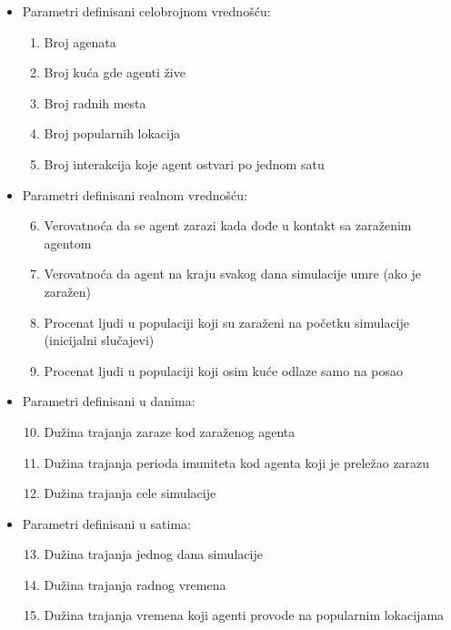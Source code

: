 \begin{itemize}
    \item Parametri definisani celobrojnom vrednošću:
    \begin{enumerate}
        \item Broj agenata
        \item Broj kuća gde agenti žive
        \item Broj radnih mesta
        \item Broj popularnih lokacija
        \item Broj interakcija koje agent ostvari po jednom satu
    \end{enumerate}
    \item Parametri definisani realnom vrednošću:
    \begin{enumerate}
        \setcounter{enumi}{5}
        \item Verovatnoća da se agent zarazi kada dođe u kontakt sa zaraženim agentom
        \item Verovatnoća da agent na kraju svakog dana simulacije umre (ako je zaražen)
        \item Procenat ljudi u populaciji koji su zaraženi na početku simulacije (inicijalni slučajevi)
        \item Procenat ljudi u populaciji koji osim kuće odlaze samo na posao
    \end{enumerate}
    \item Parametri definisani u danima:
    \begin{enumerate}
        \setcounter{enumi}{9}
        \item Dužina trajanja zaraze kod zaraženog agenta
        \item Dužina trajanja perioda imuniteta kod agenta koji je preležao zarazu
        \item Dužina trajanja cele simulacije
    \end{enumerate}
    \item Parametri definisani u satima:
    \begin{enumerate}
        \setcounter{enumi}{12}
        \item Dužina trajanja jednog dana simulacije
        \item Dužina trajanja radnog vremena
        \item Dužina trajanja vremena koji agenti provode na popularnim lokacijama
    \end{enumerate}
\end{itemize}

